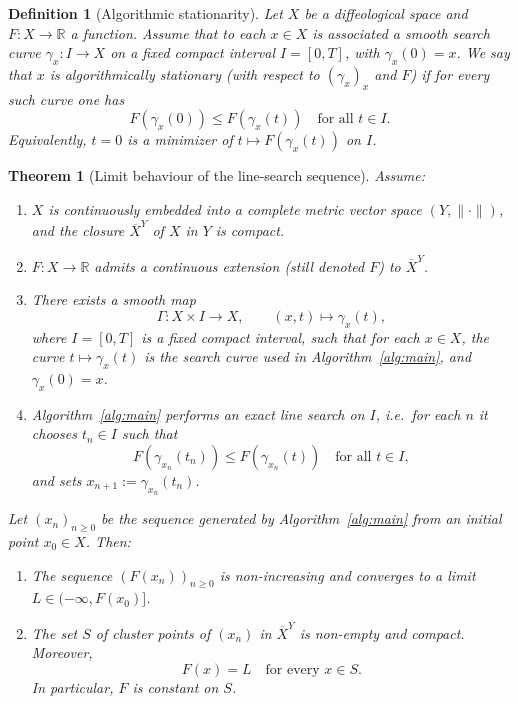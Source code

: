 \documentclass{amsart}
\newcounter{thm}
\newcounter{ex}
\newcounter{re}
\newtheorem{Theorem}[thm]{Theorem}
\newtheorem{Definition}[thm]{Definition}
\begin{document}
{\color{black}
\begin{Definition}[Algorithmic stationarity]\label{def:alg-stationary}
Let $X$ be a diffeological space and $F:X\to\mathbb{R}$ a function.
Assume that to each $x\in X$ is associated a smooth search curve
$\gamma_x : I \to X$ on a fixed compact interval $I=[0,T]$, with $\gamma_x(0)=x$.
We say that $x$ is \emph{algorithmically stationary} (with respect to $(\gamma_x)_x$ and $F$)
if for every such curve one has
\[
F(\gamma_x(0)) \leq F(\gamma_x(t)) \quad \text{for all } t\in I.
\]
Equivalently, $t=0$ is a minimizer of $t\mapsto F(\gamma_x(t))$ on $I$.
\end{Definition}
\begin{Theorem}[Limit behaviour of the line-search sequence]\label{thm:main-convergence}
Assume:
\begin{enumerate}
  \item[(H1)] $X$ is continuously embedded into a complete metric vector space $(Y,\|\cdot\|)$,
  and the closure $\overline{X}^Y$ of $X$ in $Y$ is compact.

  \item[(H2)] $F:X\to\mathbb{R}$ admits a continuous extension 
  (still denoted $F$) to $\overline{X}^Y$.

  \item[(H3)] There exists a smooth map 
  \[
    \Gamma : X\times I \longrightarrow X,\qquad (x,t)\mapsto \gamma_x(t),
  \]
  where $I=[0,T]$ is a fixed compact interval, such that for each $x\in X$,
  the curve $t\mapsto\gamma_x(t)$ is the search curve used in Algorithm~\ref{alg:main},
  and $\gamma_x(0)=x$.

  \item[(H4)] Algorithm~\ref{alg:main} performs an exact line search on $I$, i.e.\ for each $n$
  it chooses $t_n\in I$ such that
  \[
    F(\gamma_{x_n}(t_n)) \leq F(\gamma_{x_n}(t)) \quad \text{for all } t\in I,
  \]
  and sets $x_{n+1}:=\gamma_{x_n}(t_n)$.
\end{enumerate}

Let $(x_n)_{n\geq 0}$ be the sequence generated by Algorithm~\ref{alg:main} from an initial point
$x_0\in X$. Then:

\begin{enumerate}
  \item[(i)] The sequence $(F(x_n))_{n\geq 0}$ is non-increasing and converges to
  a limit $L\in(-\infty,F(x_0)]$.

  \item[(ii)] The set $S$ of cluster points of $(x_n)$ in $\overline{X}^Y$ is non-empty and compact.
  Moreover,
  \[
    F(x) = L \quad \text{for every } x\in S.
  \]
  In particular, $F$ is constant on $S$.


\end{enumerate}
\end{Theorem}}
\end{document}
